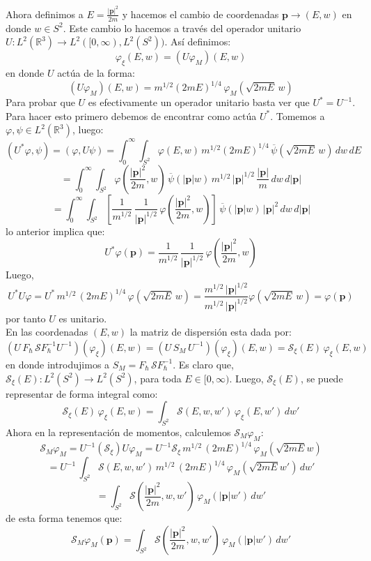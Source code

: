 \documentclass[12pt]{book}
\numberwithin{equation}{chapter}
\def\ol{\overline}
\def\R{\mathbb{R}}
\def\S{\mathcal{S}}
\def\rar{\rightarrow}
\def\P{\mathbf{p}}
\begin{document}
Ahora definimos a $E= \frac{|\P|^{2}}{2m}$ y hacemos el cambio de coordenadas $\P \rar (E,w)$ en donde $w \in S^{2}$. Este cambio lo hacemos a trav\'es del operador unitario $U: L^{2}(\R^{3}) \rar L^{2}( [0,\infty),L^{2}(S^{2}) ) $. As\'i definimos:
$$ \varphi_{\xi}(E,w) =(U \varphi_{M} ) (E,w) $$
en donde $U$ act\'ua de la forma:
$$ (U \varphi_{M}) (E,w) = m^{1/2} (2mE)^{1/4}\, \varphi_{M} \left( \sqrt{2mE}\,w \right) $$
Para probar que $U$ es efectivamente un operador unitario basta ver que $U^{*}=U^{-1}$. Para hacer esto primero debemos de encontrar como act\'ua $U^{*}$. Tomemos a $\varphi,\psi \in L^{2}(\R^{3})$, luego:
$$ ( U^{*}\varphi,\psi ) = ( \varphi,U\psi )=\int_{0}^{\infty} \int_{S^{2}} \varphi(E,w)\, m^{1/2} (2mE)^{1/4} \, \ol{\psi}\left( \sqrt{2mE}\,w \right) \, dw\, dE $$
$$ = \int_{0}^{\infty} \int_{S^{2}} \varphi \left(\frac{|\P|^{2}}{2m},w \right) \, \ol{\psi} (|\P| w) \, m^{1/2}\,|\P|^{1/2} \, \frac{|\P|}{m} \, dw \, d|\P| $$
$$ = \int_{0}^{\infty} \int_{S^{2}} \left[ \frac{1}{m^{1/2}} \, \frac{1}{|\P|^{1/2}}\, \varphi \left(\frac{|\P|^{2}}{2m},w \right) \right] \, \ol{\psi}(|\P| w)\, |\P|^{2} \, dw \,d|\P|    $$
lo anterior implica que:
$$ U^{*} \varphi(\P)= \frac{1}{m^{1/2}} \, \frac{1}{|\P|^{1/2}}\, \varphi \left(\frac{|\P|^{2}}{2m},w \right) $$
Luego,
$$ U^{*}U \varphi= U^{*} \, m^{1/2}\, (2mE)^{1/4} \, \varphi ( \sqrt{2mE}\,w ) = \frac{ m^{1/2}\, |\P|^{1/2} }{m^{1/2}\, |\P|^{1/2}} \varphi( \sqrt{2mE}\,w ) = \varphi( \P ) $$
por tanto $U$ es unitario.\\
En las coordenadas $(E,w)$ la matriz de dispersi\'on esta dada por:
$$ ( U\,F_{\hbar}\,\S F_{\hbar}^{-1} U^{-1} ) (\varphi_{\xi})(E,w)= ( U\, S_{M} \,U^{-1} ) (\varphi_{\xi})(E,w) =\S_{\xi}(E) \, \varphi_{\xi}(E,w)  $$
en donde introdujimos a $ S_{M}= F_{\hbar}\,\S F_{\hbar}^{-1}$. Es claro que, $\S_{\xi}(E): L^{2}(S^{2}) \rar L^{2}(S^{2}) $, para toda $E \in [0,\infty)$. Luego, $\S_{\xi}(E)$, se puede representar de forma integral como:
$$ \S_{\xi}(E) \, \varphi_{\xi}(E,w)= \int_{S^{2}} \S(E,w,w')\, \varphi_{\xi}(E,w')\, dw' $$
Ahora en la representaci\'on de momentos, calculemos $\S_{M}\varphi_{M}$:
$$ \S_{M} \varphi_{M}= U^{-1} (\S_{\xi}) U \varphi_{M} = U^{-1} \S_{\xi}\, m^{1/2} \, (2mE)^{1/4} \, \varphi_{M}( \sqrt{2mE}w ) $$
$$= U^{-1} \, \int_{S^{2}} \S(E,w,w')\, m^{1/2} \, (2mE)^{1/4} \, \varphi_{M}( \sqrt{2mE}w' )\, dw' $$
$$ = \int_{S^{2}} \S\left( \frac{|\P|^{2}}{2m},w,w' \right)\, \varphi_{M}(|\P|w')\, dw' $$
de esta forma tenemos que:
\begin{equation}\label{Sm-pm}
\S_{M}\varphi_{M}(\P)= \int_{S^{2}} \S\left( \frac{|\P|^{2}}{2m},w,w' \right)\, \varphi_{M}(|\P|w')\, dw'
\end{equation}
\end{document}
